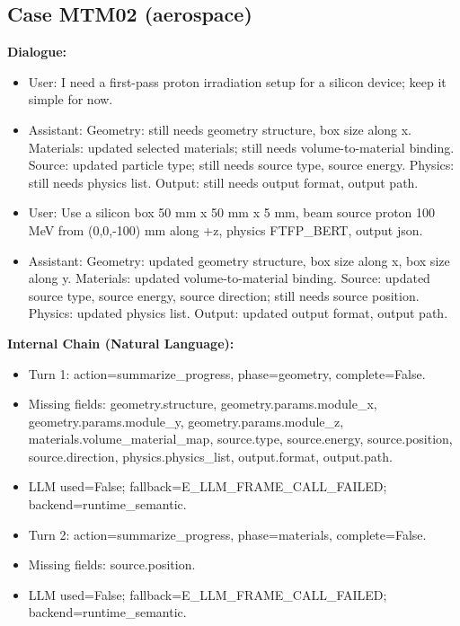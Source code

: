 \documentclass[11pt]{ctexart}
\begin{document}
\subsection{Case MTM02 (aerospace)}
\textbf{Dialogue:}
\begin{itemize}
\item User: I need a first-pass proton irradiation setup for a silicon device; keep it simple for now.
\item Assistant: Geometry: still needs geometry structure, box size along x. Materials: updated selected materials; still needs volume-to-material binding. Source: updated particle type; still needs source type, source energy. Physics: still needs physics list. Output: still needs output format, output path.
\item User: Use a silicon box 50 mm x 50 mm x 5 mm, beam source proton 100 MeV from (0,0,-100) mm along +z, physics FTFP\_BERT, output json.
\item Assistant: Geometry: updated geometry structure, box size along x, box size along y. Materials: updated volume-to-material binding. Source: updated source type, source energy, source direction; still needs source position. Physics: updated physics list. Output: updated output format, output path.
\end{itemize}
\textbf{Internal Chain (Natural Language):}
\begin{itemize}
\item Turn 1: action=summarize\_progress, phase=geometry, complete=False.
\item Missing fields: geometry.structure, geometry.params.module\_x, geometry.params.module\_y, geometry.params.module\_z, materials.volume\_material\_map, source.type, source.energy, source.position, source.direction, physics.physics\_list, output.format, output.path.
\item LLM used=False; fallback=E\_LLM\_FRAME\_CALL\_FAILED; backend=runtime\_semantic.
\item Turn 2: action=summarize\_progress, phase=materials, complete=False.
\item Missing fields: source.position.
\item LLM used=False; fallback=E\_LLM\_FRAME\_CALL\_FAILED; backend=runtime\_semantic.
\end{itemize}
\end{document}
